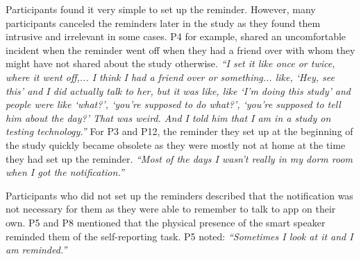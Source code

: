         Participants found it very simple to set up the reminder. However, many participants canceled the reminders later in the study as they found them intrusive and irrelevant in some cases.
        P4 for example, shared an uncomfortable incident when the reminder went off when they had a friend over with whom they might have not shared about the study otherwise.
                \textit{``I set it like once or twice, where it went off,...                %
                I think I had a friend over or something... like, `Hey, see this' and I did actually talk to her, but it was like, like `I'm doing this study' and people were like `what?', `you're supposed to do what?', `you're supposed to tell him about the day?' 
                That was weird. And I told him that I am in a study on testing technology.''}
        For P3 and P12, the reminder they set up at the beginning of the study quickly became obsolete as they were mostly not at home at the time they had set up the reminder.
                \textit{``Most of the days I wasn't really in my dorm room when I got the notification.''}
        
         
        Participants who did not set up the reminders described that the notification was not necessary for them as they were able to remember to talk to \acl{app} on their own. 
        P5 and P8 mentioned that the physical presence of the smart speaker reminded them of the self-reporting task. P5 noted: 
                \textit{``Sometimes I look at it and I am reminded.''}
        
